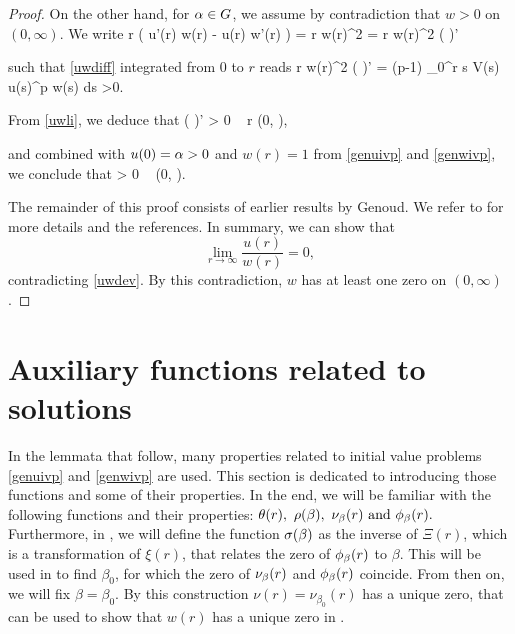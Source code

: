 \begin{proof}
On the other hand, for $\alpha \in G$, we assume by contradiction that $w > 0$
on $(0, \infty)$. 
We write
\be
    r \left( u'(r) w(r) - u(r) w'(r) \right)
    = r w(r)^2 
    = r w(r)^2 \left(  \right)'
\ee

such that \cref{uwdiff} integrated from $0$ to $r$ reads
\be \label{uwli}
r w(r)^2 \left(  \right)' = (p-1) \int_0^r s V(s) u(s)^p w(s) ds >0.
\ee

From \eqref{uwli}, we deduce that 
\be \label{uwdev}
    \left(  \right)' > 0 \quad {}~ r \in (0, \infty),
\ee

and combined with $u(0) = \alpha > 0$ and $w(r) = 1$ from \eqref{genuivp} and
\eqref{genwivp}, we conclude that
\be \label{uwpos}
     > 0 \quad {}~ (0, \infty).
\ee

The remainder of this proof consists of earlier results by Genoud. We refer to
\cite[Proof of Lemma  2, p. 487]{gen11} for more details and the references. In
summary, we can show that 
\[
    \underset{r\to\infty}{\lim} \frac{u(r)}{w(r)} = 0,
\]
contradicting \eqref{uwdev}. By this contradiction, $w$ has at least one zero on
$(0, \infty)$.
% 
% 
\end{proof}

\section{Auxiliary functions related to solutions}

In the lemmata that follow, many properties related to initial value problems
\eqref{genuivp} and \eqref{genwivp} are used. This section is dedicated to
introducing those functions and some of their properties. In the end, we will be
familiar with the following functions and their properties: $\theta(r), ~ \rho(\beta), ~
\nu_{\beta}(r) ~ \text{and} ~ \phi_{\beta}(r).$ Furthermore, in , we will define
the function $\sigma(\beta)$ as the inverse of $\Xi(r)$, which is a transformation of
$\xi(r)$, that relates the zero of $\phi_{\beta}(r)$ to $\beta$. This will be
used in  to find $\beta_0$, for which the zero of $\nu_{\beta}(r)$ and
$\phi_{\beta}(r)$ coincide. From then on, we will fix $\beta = \beta_0$. By this
construction $\nu(r)=\nu_{\beta_0}(r)$ has a unique zero, that can be used to
show that $w(r)$ has a unique zero in .

